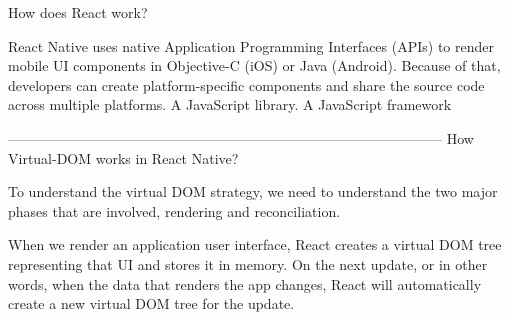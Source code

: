 How does React work?

React Native uses native Application Programming Interfaces (APIs) to render mobile UI 
components in Objective-C (iOS) or Java (Android). Because of that, developers 
can create platform-specific components and share the source code across multiple platforms. 
A JavaScript library. A JavaScript framework

---------------------------------------------------------------------------------------------
How Virtual-DOM works in React Native?

To understand the virtual DOM strategy, we need to understand the two major 
phases that are involved, rendering and reconciliation.

When we render an application user interface, 
React creates a virtual DOM tree representing that UI and stores it in memory. 
On the next update, or in other words, when the data that renders the app changes, 
React will automatically create a new virtual DOM tree for the update.